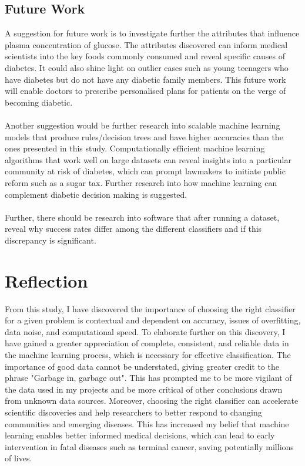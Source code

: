 \documentclass{article}
\begin{document}
    \subsection{Future Work}
    A suggestion for future work is to investigate further the attributes that influence plasma concentration of glucose. The attributes discovered can inform medical scientists into the key foods commonly consumed and reveal specific causes of diabetes. It could also shine light on outlier cases such as young teenagers who have diabetes but do not have any diabetic family members. This future work will enable doctors to prescribe personalised plans for patients on the verge of becoming diabetic.
    \\
    \\
    Another suggestion would be further research into scalable machine learning models that produce rules/decision trees and have higher accuracies than the ones presented in this study. Computationally efficient machine learning algorithms that work well on large datasets can reveal insights into a particular community at risk of diabetes, which can prompt lawmakers to initiate public reform such as a sugar tax. Further research into how machine learning can complement diabetic decision making is suggested.
    \\
    \\
    Further, there should be research into software that after running a dataset, reveal why success rates differ among the different classifiers and if this discrepancy is significant. 	
    \newpage
    \section{Reflection}
    From this study, I have discovered the importance of choosing the right classifier for a given problem is contextual and dependent on accuracy, issues of overfitting, data noise, and computational speed. To elaborate further on this discovery, I have gained a greater appreciation of complete, consistent, and reliable data in the machine learning process, which is necessary for effective classification. The importance of good data cannot be understated, giving greater credit to the phrase "Garbage in, garbage out". This has prompted me to be more vigilant of the data used in my projects and be more critical of other conclusions drawn from unknown data sources. Moreover, choosing the right classifier can accelerate scientific discoveries and help researchers to better respond to changing communities and emerging diseases. This has increased my belief that machine learning enables better informed medical decisions, which can lead to early intervention in fatal diseases such as terminal cancer, saving potentially millions of lives.  				
			
\end{document}
